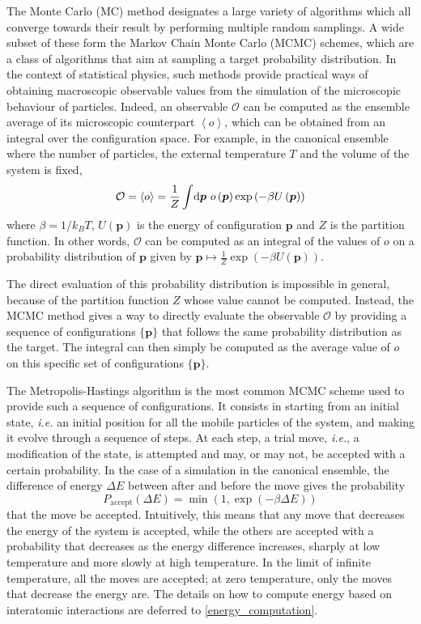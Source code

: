 \documentclass[main.tex]{subfiles}
\begin{document}
The Monte Carlo (MC) method designates a large variety of algorithms which all converge towards their result by performing multiple random samplings. A wide subset of these form the Markov Chain Monte Carlo (MCMC) schemes, which are a class of algorithms that aim at sampling a target probability distribution. In the context of statistical physics, such methods provide practical ways of obtaining macroscopic observable values from the simulation of the microscopic behaviour of particles. Indeed, an observable $\mathcal O$ can be computed as the ensemble average of its microscopic counterpart $\left<o\right>$, which can be obtained from an integral over the configuration space. For example, in the canonical ensemble where the number of particles, the external temperature $T$ and the volume of the system is fixed, \[\mathcal O = \left<o\right> = \frac1Z\int\!\text d{\boldsymbol p}\  o\left({\boldsymbol p}\right)\exp\left(-\beta U\left({\boldsymbol p}\right)\right)\label{eq:canonicalensemble}\] where $\beta = 1/k_BT$, $U\left({\boldsymbol p}\right)$ is the energy of configuration $\boldsymbol p$ and $Z$ is the partition function. In other words, $\mathcal O$ can be computed as an integral of the values of $o$ on a probability distribution of $\boldsymbol p$ given by $\boldsymbol p\mapsto \frac1Z\exp\left(-\beta U\left({\boldsymbol p}\right)\right)$.

The direct evaluation of this probability distribution is impossible in general, because of the partition function $Z$ whose value cannot be computed. Instead, the MCMC method gives a way to directly evaluate the observable $\mathcal O$ by providing a sequence of configurations $\{\boldsymbol p\}$ that follows the same probability distribution as the target. The integral can then simply be computed as the average value of $o$ on this specific set of configurations $\{\boldsymbol p\}$.

\label{metropolis}

The Metropolis-Hastings algorithm is the most common MCMC scheme used to provide such a sequence of configurations. It consists in starting from an initial state, \textit{i.e.} an initial position for all the mobile particles of the system, and making it evolve through a sequence of steps. At each step, a trial move, \textit{i.e.}, a modification of the state, is attempted and may, or may not, be accepted with a certain probability. In the case of a simulation in the canonical ensemble, the difference of energy $\Delta E$ between after and before the move gives the probability
\[P_\text{accept}(\Delta E) = \min\left(1, \exp\left(-\beta \Delta E\right)\right)\label{eq:MCcanonicalaccept}\]
that the move be accepted. Intuitively, this means that any move that decreases the energy of the system is accepted, while the others are accepted with a probability that decreases as the energy difference increases, sharply at low temperature and more slowly at high temperature. In the limit of infinite temperature, all the moves are accepted; at zero temperature, only the moves that decrease the energy are. The details on how to compute energy based on interatomic interactions are deferred to \cref{energy_computation}.
\end{document}
